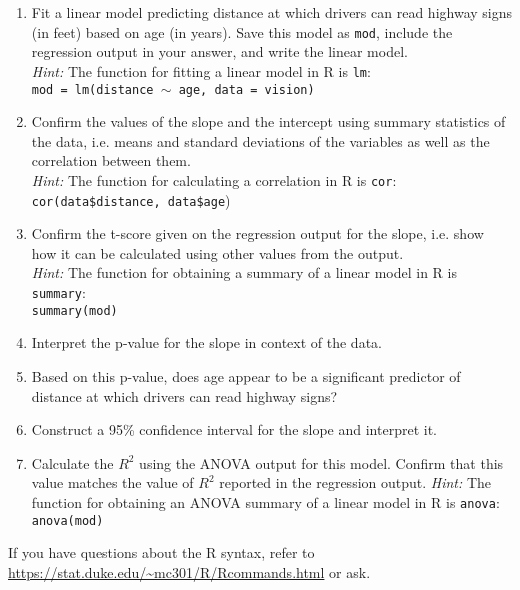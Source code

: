 \documentclass[11pt]{article}
\begin{document}
\begin{enumerate}
\item Fit a linear model predicting distance at which drivers can read highway signs (in feet) based on age (in years). Save this model as \texttt{mod}, include the regression output in your answer, and write the linear model. \\
\textit{Hint:} The function for fitting a linear model in R is \texttt{lm}: \\
\texttt{mod = lm(distance $\sim$ age, data = vision)} 
\item Confirm the values of the slope and the intercept using summary statistics of the data, i.e. means and standard deviations of the variables as well as the correlation between them. \\
\textit{Hint:} The function for calculating a correlation in R is \texttt{cor}: \\
\texttt{cor(data\$distance, data\$age})
\item Confirm the t-score given on the regression output for the slope, i.e. show how it can be calculated using other values from the output. \\
\textit{Hint:} The function for obtaining a summary of a linear model in R is \texttt{summary}: \\\texttt{summary(mod)}
\item Interpret the p-value for the slope in context of the data.
\item Based on this p-value, does age appear to be a significant predictor of distance at which drivers can read highway signs?
\item Construct a 95\% confidence interval for the slope and interpret it.
\item Calculate the $R^2$ using the ANOVA output for this model. Confirm that this value matches the value of $R^2$ reported in the regression output.
\textit{Hint:} The function for obtaining an ANOVA summary of a linear model in R is \texttt{anova}: \\\texttt{anova(mod)}
 \end{enumerate}
 
If you have questions about the R syntax, refer to \url{https://stat.duke.edu/~mc301/R/Rcommands.html} or ask.
\end{document}
